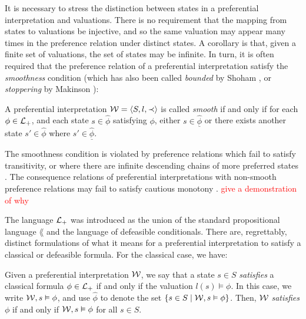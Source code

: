 It is necessary to stress the distinction between states in a preferential interpretation and valuations. There is no
requirement that the mapping from states to valuations be injective, and so the same valuation may appear many times in the
preference relation under distinct states. A corollary is that, given a finite set of valuations, the set of states may
be infinite. In turn, it is often required that the preference relation of a preferential interpretation satisfy the
\textit{smoothness} condition (which has also been called \textit{bounded} by Shoham \cite{shohamSemanticApproach}, or
\textit{stoppering} by Makinson \cite{makinson2003bridges}):

\begin{definition}
	\label{definition:smoothness} 

	A preferential interpretation $\mathcal{W} = \langle S,l,\prec \rangle$ is called \textit{smooth} if and only if for each $\phi \in \mathcal{L}_+$, and each
	state $s \in \hat{\phi}$ satisfying $\phi$, either $s \in \underline{\hat{\phi}}$ or there exists another state $s' \in
	\hat{\phi}$ where $s' \in \underline{\hat{\phi}}$.
\end{definition}

The smoothness condition is violated by preference relations which fail to satisfy transitivity, or where there are
infinite descending chains of more preferred states \cite{Schlechta1996}. The consequence relations of preferential interpretations
with non-smooth preference relations may fail to satisfy cautious monotony \cite{kraus1990nonmonotonic,makinson2003bridges}.
\textcolor{red}{give a demonstration of why}

The language $\mathcal{L}_+$ was introduced as the union of the standard propositional language $\lang$ and the language of
defeasible conditionals. There are, regrettably, distinct formulations of what it means for a preferential interpretation
to satisfy a classical or defeasible formula. For the classical case, we have:

\begin{definition}
	\label{definition:state-satisfaction}

	Given a preferential interpretation $\mathcal{W}$, we say that a state $s \in S$ \emph{satisfies} a classical formula
	$\phi \in \mathcal{L}_+$ if and only if the valuation $l(s) \vDash \phi$. In this case, we write $\mathcal{W}, s \vDash \phi$, and use
	$\hat{\phi}$ to denote the set $\{s \in S \mid \mathcal{W},s \vDash \phi \}$. Then, $\mathcal{W}$ \textit{satisfies} $\phi$ if and
	only if $\mathcal{W} , s \vDash \phi$ for all $s \in S$.
\end{definition}

